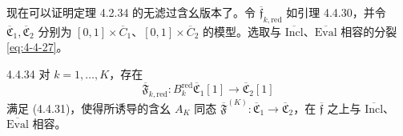 现在可以证明定理 4.2.34 的无滤过含幺版本了。令
$\overline{\mathfrak f}_{k,\mathrm{red}}$ 如引理 4.4.30，并令
$\overline{\mathfrak C}_1,\overline{\mathfrak C}_2$ 分别为
$[0,1]\times\overline C_1$、$[0,1]\times\overline C_2$ 的模型。选取与
$\overline{\mathrm{Incl}}$、$\overline{\mathrm{Eval}}$ 相容的分裂
\eqref{eq:4-4-27}。

\begin{proposition}{4.4.34}\label{prop:4-4-34}
对 $k=1,\ldots,K$，存在
\[
 \overline{\mathfrak F}_{k,\mathrm{red}}\colon
 B_k^{\mathrm{red}}\overline{\mathfrak C}_1[1]
 \longrightarrow\overline{\mathfrak C}_2[1]
\]
满足 (4.4.31)，使得所诱导的含幺 $A_K$ 同态
$\overline{\mathfrak F}^{(K)}\colon
\overline{\mathfrak C}_1\to\overline{\mathfrak C}_2$，在
$\overline{\mathfrak f}$ 之上与 $\overline{\mathrm{Incl}}$、
$\overline{\mathrm{Eval}}$ 相容。
\end{proposition}

